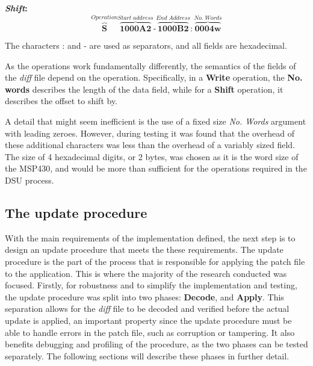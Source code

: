 \textbf{\textit{Shift}:}
\begin{equation*}
    \overbrace{\textbf{S}}^{Operation}
    \overbrace{\textbf{1000A2}}^{Start\;address}    \text{-}
    \overbrace{\textbf{1000B2}}^{End\;Address}      :
    \overbrace{\textbf{0004w}}^{No.\;Words}
\end{equation*}

\noindent The characters : and - are used as separators, and all fields are hexadecimal.

As the operations work fundamentally differently, the semantics of the fields of the \textit{diff} file depend on the operation. Specifically, in a \textbf{Write} operation, the \textbf{No. words} describes the length of the data field, while for a \textbf{Shift} operation, it describes the offset to shift by.

A detail that might seem inefficient is the use of a fixed size \textit{No. Words} argument with leading zeroes. However, during testing it was found that the overhead of these additional characters was less than the overhead of a variably sized field. The size of 4 hexadecimal digits, or 2 bytes, was chosen as it is the word size of the MSP430, and would be more than sufficient for the operations required in the DSU process. 

\subsection{The update procedure}\label{sec:updateprocedure}
With the main requirements of the implementation defined, the next step is to design an update procedure that meets the these requirements. The update procedure is the part of the process that is responsible for applying the patch file to the application. This is where the majority of the research conducted was focused. Firstly, for robustness and to simplify the implementation and testing, the update procedure was split into two phases: \textbf{Decode}, and \textbf{Apply}. This separation allows for the \textit{diff} file to be decoded and verified before the actual update is applied, an important property since the update procedure must be able to handle errors in the patch file, such as corruption or tampering. It also benefits debugging and profiling of the procedure, as the two phases can be tested separately. The following sections will describe these phases in further detail. 

